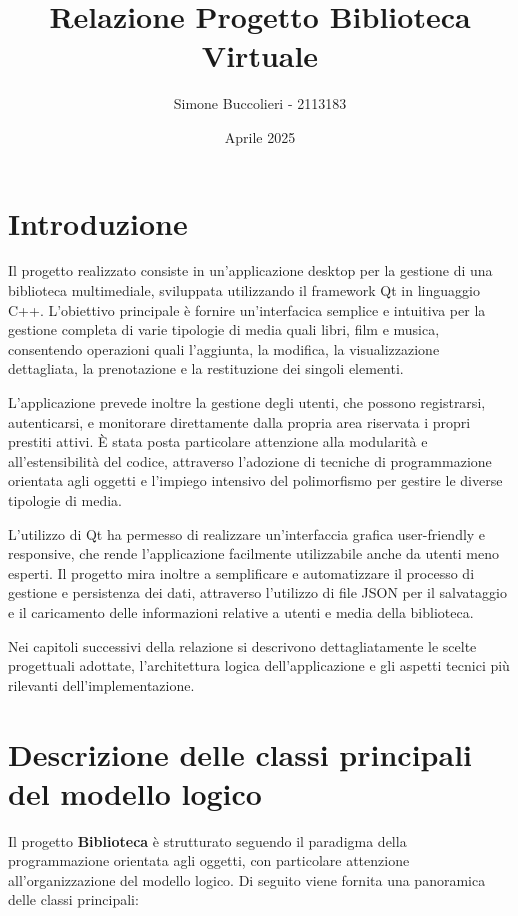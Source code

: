 \documentclass[a4paper,10pt]{article}
\title{Relazione Progetto Biblioteca Virtuale}
\author{Simone Buccolieri - 2113183}
\date{Aprile 2025}
\begin{document}
\maketitle

\section{Introduzione}

Il progetto realizzato consiste in un'applicazione desktop per la gestione di una biblioteca multimediale, sviluppata utilizzando il framework Qt in linguaggio C++. L'obiettivo principale è fornire un'interfacica semplice e intuitiva per la gestione completa di varie tipologie di media quali libri, film e musica, consentendo operazioni quali l'aggiunta, la modifica, la visualizzazione dettagliata, la prenotazione e la restituzione dei singoli elementi.

L'applicazione prevede inoltre la gestione degli utenti, che possono registrarsi, autenticarsi, e monitorare direttamente dalla propria area riservata i propri prestiti attivi. È stata posta particolare attenzione alla modularità e all'estensibilità del codice, attraverso l'adozione di tecniche di programmazione orientata agli oggetti e l'impiego intensivo del polimorfismo per gestire le diverse tipologie di media.

L'utilizzo di Qt ha permesso di realizzare un'interfaccia grafica user-friendly e responsive, che rende l'applicazione facilmente utilizzabile anche da utenti meno esperti. Il progetto mira inoltre a semplificare e automatizzare il processo di gestione e persistenza dei dati, attraverso l'utilizzo di file JSON per il salvataggio e il caricamento delle informazioni relative a utenti e media della biblioteca.

Nei capitoli successivi della relazione si descrivono dettagliatamente le scelte progettuali adottate, l'architettura logica dell'applicazione e gli aspetti tecnici più rilevanti dell'implementazione.



\section{Descrizione delle classi principali del modello logico}

Il progetto \textbf{Biblioteca} \`e strutturato seguendo il paradigma della programmazione orientata agli oggetti, con particolare attenzione all'organizzazione del modello logico. Di seguito viene fornita una panoramica delle classi principali:
\end{document}
